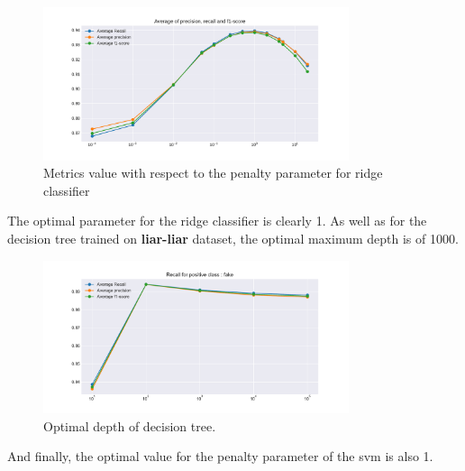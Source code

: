 \begin{figure}
 \centering
 \includegraphics[width=0.8\textwidth]{images/chapitre3/ridge}
 \caption{Metrics value with respect to the penalty parameter for ridge classifier}
 \label{fig:chap3:ridge2}
\end{figure}
The optimal parameter for the ridge classifier is clearly 1. As well as for the decision tree trained on \textbf{liar-liar} dataset, the optimal maximum depth is of 1000. 
\begin{figure}
 \centering
 \includegraphics[width=0.8\textwidth]{images/chapitre3/fake-dt}
 \caption{Optimal depth of decision tree.}
 \label{fig:chap3:dt2}
\end{figure}
And finally, the optimal value for the penalty parameter of the svm is also 1.\\

